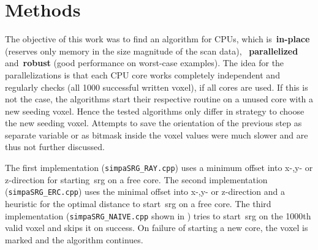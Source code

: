 \documentclass{article}
\begin{document}
\section{Methods}\label{sec:methods}
\acresetall
The objective of this work was to find an algorithm for CPUs,
which is~\textbf{in-place} (reserves only memory in the size magnitude of the scan data),
~\textbf{parallelized} and~\textbf{robust} (good performance on worst-case examples).
The idea for the parallelizations is that each CPU core works completely independent and regularly checks (all 1000 successful written voxel), if all cores are used.
If this is not the case, the algorithms start their respective routine on a unused core with a new seeding voxel.
Hence the tested algorithms only differ in strategy to choose the new seeding voxel.
Attempts to save the orientation of the previous step as separate variable or as bitmask inside the voxel values were much slower and are thus not further discussed.\par
The first implementation (\texttt{simpaSRG\_RAY.cpp}) uses a minimum offset into x-,y- or z-direction for starting~\ac{srg} on a free core. 
The second implementation (\texttt{simpaSRG\_ERC.cpp}) uses the minimal offset into x-,y- or z-direction and a heuristic for the optimal distance to start~\ac{srg} on a free core.
The third implementation (\texttt{simpaSRG\_NAIVE.cpp} shown in ) tries to start~\ac{srg} on the 1000th valid voxel and skips it on success. 
On failure of starting a new core, the voxel is marked and the algorithm continues.
\end{document}
